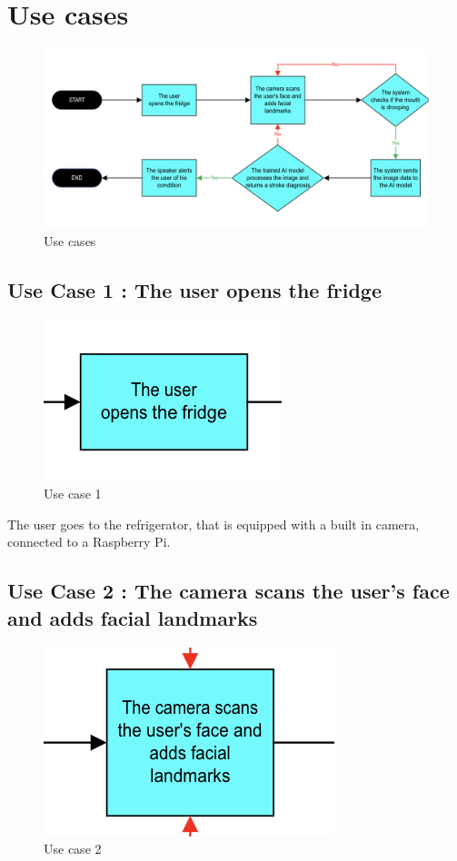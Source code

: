 \section{\textbf{Use cases}}

\begin{figure}[H]
    \centering
    \includegraphics[width=1\linewidth]{images/use_cases.png}
    \caption{Use cases}
    \label{fig:use_cases}
\end{figure}

\subsection{\textbf{Use Case 1 : The user opens the fridge}}

\begin{figure}[H]
    \centering
    \includegraphics[width=0.33\linewidth]{images/use_case1.png}
    \caption{Use case 1}
    \label{fig:use_case1}
\end{figure}

The user goes to the refrigerator, that is equipped with a built in camera, connected to a Raspberry Pi.

\subsection{\textbf{Use Case 2 : The camera scans the user's face and adds facial landmarks}}

\begin{figure}[H]
    \centering
    \includegraphics[width=0.33\linewidth]{images/use_case2.png}
    \caption{Use case 2}
    \label{fig:use_case2}
\end{figure}

